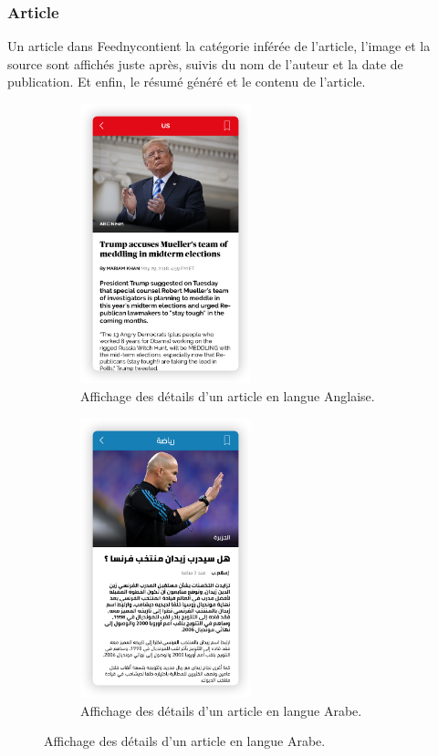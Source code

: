 \subsubsection{Article}
Un article dans \textquotedbl Feedny\textquotedbl contient la catégorie inférée de l'article, l'image et la source sont affichés juste après, suivis du nom de l'auteur et la date de publication. Et enfin, le résumé généré et le contenu de l'article.   

\begin{figure}[H]
    \begin{minipage}{0.48\textwidth}
        \begin{figure}[H]
            \centering
            \includegraphics[width=140pt]{img/chapter4/feedny/en-article.png}
            \caption{Affichage des détails d'un article en langue Anglaise.}
        \end{figure}
    \end{minipage}\hfill
    \begin {minipage}{0.48\textwidth}
    \begin{figure}[H]
        \centering
        \includegraphics[width=140pt]{img/chapter4/feedny/ar-article.png}
        \caption{Affichage des détails d'un article en langue Arabe.}
    \end{figure}
\end{minipage}
\label{article-display}
\end{figure}

